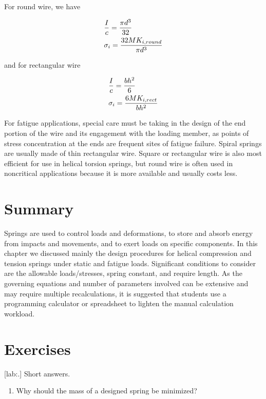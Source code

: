 \documentclass[a4paper,openany,12pt]{book}
\begin{document}
{{For round wire, we have

$$\begin{gathered}
    \frac{I}{c} = \frac{\pi d^3}{32} \hfill \\
    \sigma_i = \frac{32MK_{i,round}}{\pi d^3} \hfill \\ 
  \end{gathered}$$

and for rectangular wire

$$\begin{gathered}
    \frac{I}{c} = \frac{bh^2}{6} \hfill \\
    \sigma_i = \frac{6MK_{i,rect}}{bh^2} \hfill \\ 
  \end{gathered}$$

For fatigue applications, special care must be taking in the design of
the end portion of the wire and its engagement with the loading member,
as points of stress concentration at the ends are frequent sites of
fatigue failure. Spiral springs are usually made of thin rectangular
wire. Square or rectangular wire is also most efficient for use in
helical torsion springs, but round wire is often used in noncritical
applications because it is more available and usually costs less.

\section{Summary}
\label{summary-5}
Springs are used to control loads and deformations, to store and absorb
energy from impacts and movements, and to exert loads on specific
components. In this chapter we discussed mainly the design procedures
for helical compression and tension springs under static and fatigue
loads. Significant conditions to consider are the allowable
loads/stresses, spring constant, and require length. As the governing
equations and number of parameters involved can be extensive and may
require multiple recalculations, it is suggested that students use a
programming calculator or spreadsheet to lighten the manual calculation
workload.

\section{Exercises}
\label{exercises-5}
[lab:.] Short answers.

\begin{enumerate}
\item Why should the mass of a designed spring be minimized?


\end{enumerate}}}
\end{document}
